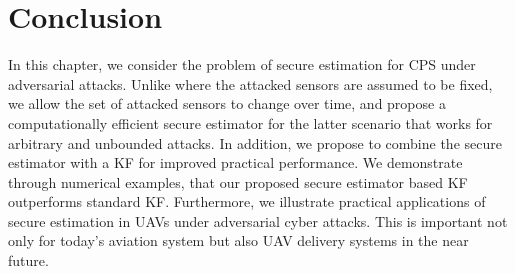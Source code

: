 \documentclass[../../thesis.tex]{subfiles}
\begin{document}

\section{Conclusion}
In this chapter, we consider the problem of secure estimation for CPS under adversarial attacks. Unlike \cite{Fawzi:2014} where the attacked sensors are assumed to be fixed, we allow the set of attacked sensors to change over time, and propose a computationally efficient secure estimator for the latter scenario that works for arbitrary and unbounded attacks. In addition, we propose to combine the secure estimator with a KF for improved practical performance. We demonstrate through numerical examples, that our proposed secure estimator based KF outperforms standard KF. Furthermore, we illustrate practical applications of secure estimation in UAVs under adversarial cyber attacks. This is important not only for today's aviation system but also UAV delivery systems in the near future. 
\end{document}
